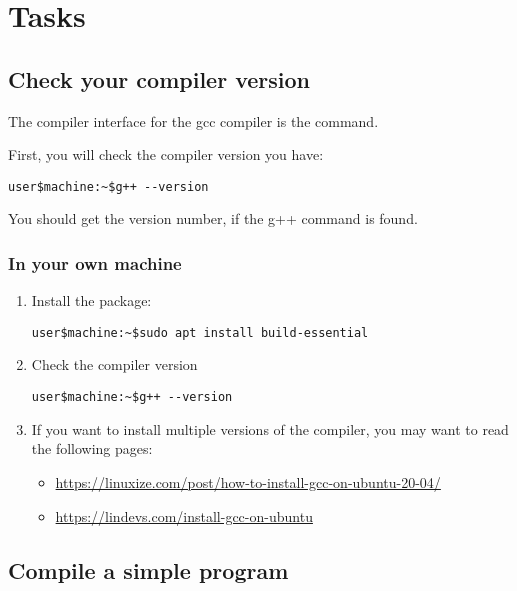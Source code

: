 \section{Tasks}

\subsection{Check your compiler version}

The compiler interface for the gcc compiler is the  command.

First, you will check the compiler version you have:

\begin{lstlisting}[style=terminal]
user$machine:~$g++ --version
\end{lstlisting}

You should get the version number, if the g++ command is found.

\subsubsection{In your own machine}

\begin{enumerate}

\item Install the  package:

\begin{lstlisting}[style=terminal]
user$machine:~$sudo apt install build-essential
\end{lstlisting}

\item Check the compiler version

\begin{lstlisting}[style=terminal]
user$machine:~$g++ --version
\end{lstlisting}

\item If you want to install multiple versions of the compiler,
      you may want to read the following pages:
  \begin{itemize}
    \item \url{https://linuxize.com/post/how-to-install-gcc-on-ubuntu-20-04/}
    \item \url{https://lindevs.com/install-gcc-on-ubuntu}
  \end{itemize}
\end{enumerate}

\subsection{Compile a simple program}

